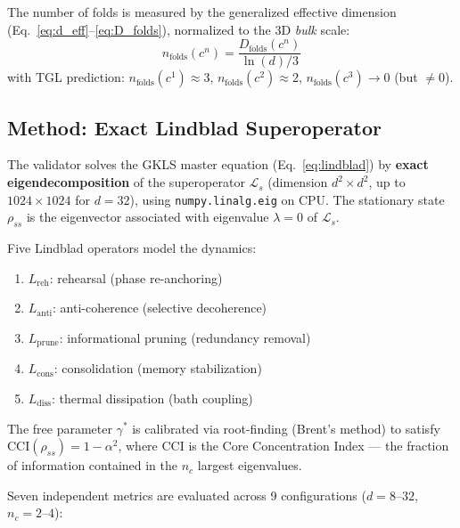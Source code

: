 \documentclass[12pt,a4paper,twoside]{article}
\newcommand{\alphaii}{\alpha^{2}}
\newcommand{\bulk}{\textit{bulk}}
\begin{document}
The number of folds is measured by the generalized effective dimension (Eq.~\ref{eq:d_eff}--\ref{eq:D_folds}), normalized to the 3D \bulk{} scale:
\begin{equation}
n_{\text{folds}}(c^n) = \frac{D_{\text{folds}}(c^n)}{\ln(d)/3}
\label{eq:n_folds}
\end{equation}
with TGL prediction: $n_{\text{folds}}(c^1) \approx 3$, $n_{\text{folds}}(c^2) \approx 2$, $n_{\text{folds}}(c^3) \to 0$ (but $\neq 0$).

\subsection{Method: Exact Lindblad Superoperator}

The validator solves the GKLS master equation (Eq.~\ref{eq:lindblad}) by \textbf{exact eigendecomposition} of the superoperator $\mathcal{L}_s$ (dimension $d^2 \times d^2$, up to $1024 \times 1024$ for $d = 32$), using \texttt{numpy.linalg.eig} on CPU. The stationary state $\rho_{ss}$ is the eigenvector associated with eigenvalue $\lambda = 0$ of $\mathcal{L}_s$.

Five Lindblad operators model the dynamics:
\begin{enumerate}[nosep]
\item $L_{\text{reh}}$: rehearsal (phase re-anchoring)
\item $L_{\text{anti}}$: anti-coherence (selective decoherence)
\item $L_{\text{prune}}$: informational pruning (redundancy removal)
\item $L_{\text{cons}}$: consolidation (memory stabilization)
\item $L_{\text{diss}}$: thermal dissipation (bath coupling)
\end{enumerate}

The free parameter $\gamma^*$ is calibrated via root-finding (Brent's method) to satisfy $\text{CCI}(\rho_{ss}) = 1 - \alphaii$, where CCI is the Core Concentration Index --- the fraction of information contained in the $n_c$ largest eigenvalues.

Seven independent metrics are evaluated across 9 configurations ($d = 8$--$32$, $n_c = 2$--$4$):
\end{document}

